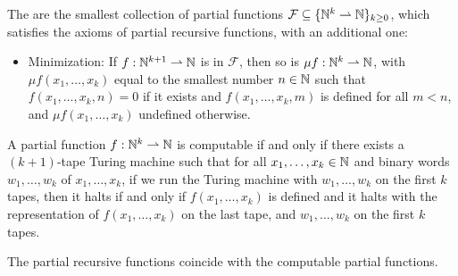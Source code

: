 \begin{definition}
  The  are the smallest collection of partial
  functions $\mathcal{F} \subseteq \{\mathbb{N}^k \rightharpoonup \mathbb{N}\}_{k \ge 0}$, which
  satisfies the axioms of partial recursive functions, with an additional one:
  \begin{itemize}
  \item Minimization: If $f: \mathbb{N}^{k+1} \rightharpoonup \mathbb{N}$ is in $\mathcal{F}$,
	then so is $\mu f: \mathbb{N}^k \rightharpoonup \mathbb{N}$, with $\mu f(x_1, \ldots,
	x_k)$ equal to the smallest number $n \in \mathbb{N}$ such that $f(x_1, \ldots, x_k,
	n) = 0$ if it exists and $f(x_1, \ldots, x_k, m)$ is defined for all $m <
	n$, and $\mu f(x_1, \ldots, x_k)$ undefined otherwise.
  \end{itemize}
\end{definition}


\begin{proposition}
  A partial function $f: \mathbb{N}^k \rightharpoonup \mathbb{N}$ is computable if and only if
  there exists a $(k+1)$-tape Turing machine such that for all $x_1, \ldots, x_k
  \in \mathbb{N}$ and binary words $w_1, \ldots, w_k$ of $x_1, \ldots, x_k$, if we run
  the Turing machine with $w_1, \ldots, w_k$ on the first $k$ tapes, then it
  halts if and only if $f(x_1, \ldots, x_k)$ is defined and it halts with the
  representation of $f(x_1, \ldots, x_k)$ on the last tape, and $w_1, \ldots,
  w_k$ on the first $k$ tapes.
\end{proposition}

\begin{theorem}
  The partial recursive functions coincide with the computable partial functions.
\end{theorem}

